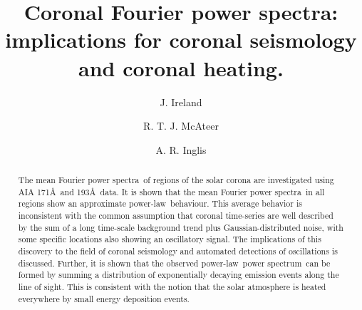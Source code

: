\documentclass{aastex}
\newcommand{\PS}{power spectrum}
\newcommand{\PA}{power spectra}
\newcommand{\PL}{power-law}
\newcommand{\mFpa}{mean Fourier \PA}
\begin{document}

\title{Coronal Fourier power spectra: implications for coronal
  seismology and coronal heating.}


\author{J. Ireland}

\author{R. T. J. McAteer}

\author{A. R. Inglis}


\begin{abstract}
The \mFpa\ of regions of the solar corona are investigated using AIA
171\AA\ and 193\AA\ data.  It is shown that the \mFpa\ in all regions
show an approximate \PL\ behaviour.  This average behavior is
inconsistent with the common assumption that coronal time-series are
well described by the sum of a long time-scale background trend plus
Gaussian-distributed noise, with some specific locations also showing
an oscillatory signal.  The implications of this discovery to the
field of coronal seismology and automated detections of oscillations
is discussed.  Further, it is shown that the observed \PL\ \PS\ can be
formed by summing a distribution of exponentially decaying emission
events along the line of sight.  This is consistent with the notion
that the solar atmosphere is heated everywhere by small energy
deposition events.
\end{abstract}
\end{document}
